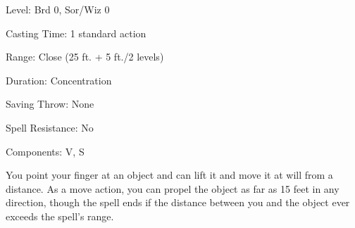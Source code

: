 
\begin{description*}
\item[Level:] Brd 0, Sor/Wiz 0
\item[Casting Time:] 1 standard action
\item[Range:] Close (25 ft. + 5 ft./2 levels)
\item[Duration:] Concentration
\item[Saving Throw:] None
\item[Spell Resistance:] No
\item[Components:] V, S
\end{description*}

You point your finger at an object and can lift it and move it at will from a distance.
As a move action, you can propel the object as far as 15 feet in any direction,
though the spell ends if the distance between you and the object ever exceeds the
spell's range.
